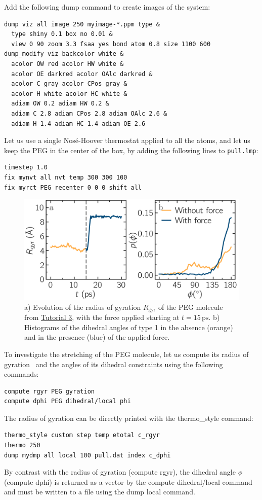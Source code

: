 \documentclass[9pt,tutorial]{livecoms}
\newcommand{\lmpcmd}[1]{\hspace{0pt}\colorbox{listing}{\textcolor{command}{\small{#1}}}\hspace{0pt}} %
\newcommand{\flecmd}[1]{\textcolor{command}{\texttt{#1}}} %
\begin{document}
Add the following \lmpcmd{dump} command to create images of the system:
\begin{lstlisting}
dump viz all image 250 myimage-*.ppm type &
  type shiny 0.1 box no 0.01 &
  view 0 90 zoom 3.3 fsaa yes bond atom 0.8 size 1100 600
dump_modify viz backcolor white &
  acolor OW red acolor HW white &
  acolor OE darkred acolor OAlc darkred &
  acolor C gray acolor CPos gray &
  acolor H white acolor HC white &
  adiam OW 0.2 adiam HW 0.2 &
  adiam C 2.8 adiam CPos 2.8 adiam OAlc 2.6 &
  adiam H 1.4 adiam HC 1.4 adiam OE 2.6
\end{lstlisting}
Let us use a single Nosé-Hoover thermostat applied to all the atoms,
and let us keep the PEG in the center of the box, by adding
the following lines to \flecmd{pull.lmp}:
\begin{lstlisting}
timestep 1.0
fix mynvt all nvt temp 300 300 100
fix myrct PEG recenter 0 0 0 shift all
\end{lstlisting}

\begin{figure}
\centering
\includegraphics[width=\linewidth]{PEG-distance}
\caption{a) Evolution of
the radius of gyration $R_\text{gyr}$ of the PEG molecule
from \hyperref[all-atom-label]{Tutorial 3}, with the force
applied starting at $t = 15\,\text{ps}$.  b) Histograms of the dihedral angles of type 1
in the absence (orange) and in the presence (blue) of the applied force.}
\label{fig:PEG-distance}
\end{figure}

To investigate the stretching of the PEG molecule, let us compute its radius of
gyration~\cite{fixmanRadiusGyrationPolymer1962a} and the angles of its dihedral
constraints using the following commands:
\begin{lstlisting}
compute rgyr PEG gyration
compute dphi PEG dihedral/local phi
\end{lstlisting}
The radius of gyration can be directly printed with the \lmpcmd{thermo\_style} command:
\begin{lstlisting}
thermo_style custom step temp etotal c_rgyr
thermo 250
dump mydmp all local 100 pull.dat index c_dphi
\end{lstlisting}
By contrast with the radius of gyration (compute \lmpcmd{rgyr}), the dihedral angle
$\phi$ (compute \lmpcmd{dphi}) is returned as a vector by the \lmpcmd{compute dihedral/local}
command and must be written to a file using the \lmpcmd{dump local} command.
\end{document}
